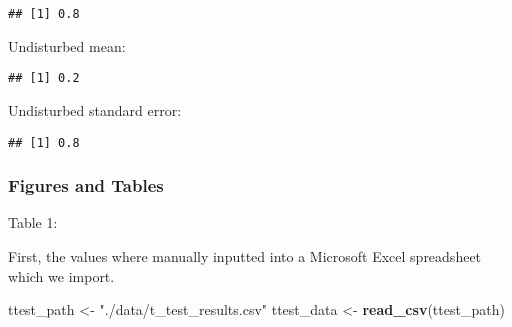 \documentclass[
]{article}
\newenvironment{Shaded}{\begin{snugshade}}{\end{snugshade}}
\newcommand{\FunctionTok}[1]{\textcolor[rgb]{0.13,0.29,0.53}{\textbf{#1}}}
\newcommand{\NormalTok}[1]{#1}
\newcommand{\OtherTok}[1]{\textcolor[rgb]{0.56,0.35,0.01}{#1}}
\newcommand{\SpecialCharTok}[1]{\textcolor[rgb]{0.81,0.36,0.00}{\textbf{#1}}}
\newcommand{\StringTok}[1]{\textcolor[rgb]{0.31,0.60,0.02}{#1}}
\begin{document}
\begin{verbatim}
## [1] 0.8
\end{verbatim}

Undisturbed mean:

\begin{Shaded}
\end{Shaded}

\begin{verbatim}
## [1] 0.2
\end{verbatim}

Undisturbed standard error:

\begin{Shaded}
\end{Shaded}

\begin{verbatim}
## [1] 0.8
\end{verbatim}

\hypertarget{figures-and-tables}{%
\subsubsection{Figures and Tables}\label{figures-and-tables}}

Table 1:

First, the values where manually inputted into a Microsoft Excel
spreadsheet which we import.

\begin{Shaded}
\begin{Highlighting}[]
\NormalTok{ttest\_path }\OtherTok{\textless{}{-}} \StringTok{"./data/t\_test\_results.csv"}
\NormalTok{ttest\_data }\OtherTok{\textless{}{-}} \FunctionTok{read\_csv}\NormalTok{(ttest\_path)}
\end{Highlighting}
\end{Shaded}
\end{document}
